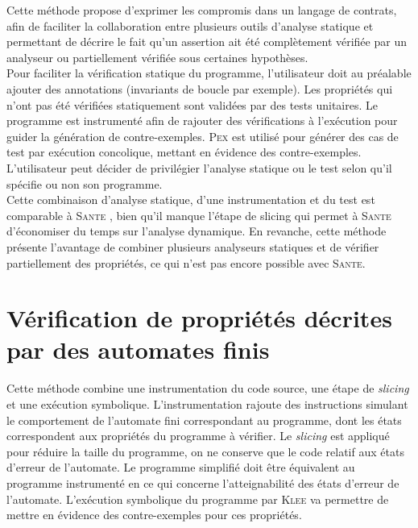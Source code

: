Cette méthode propose d'exprimer les compromis dans un langage de contrats,
afin de faciliter la collaboration entre plusieurs outils d'analyse statique
et permettant de décrire le fait qu'un assertion ait été complètement vérifiée
par un analyseur ou partiellement vérifiée sous certaines hypothèses.\\

Pour faciliter la vérification statique du programme, l'utilisateur doit au
préalable ajouter des annotations (invariants de boucle par exemple). Les
propriétés qui n'ont pas été vérifiées statiquement sont validées par des tests
unitaires. Le programme est instrumenté afin de rajouter des vérifications à
l'exécution pour guider la génération de contre-exemples. \textsc{Pex}
\cite{PEX} est utilisé pour générer des cas de test par exécution concolique,
mettant en évidence des contre-exemples. L'utilisateur peut décider de
privilégier l'analyse statique ou le test selon qu'il spécifie ou non son
programme.\\

Cette combinaison d'analyse statique, d'une instrumentation et du test est
comparable à \textsc{Sante} \cite{SANTE}, bien qu'il manque l'étape de slicing
qui permet à \textsc{Sante} d'économiser du temps sur l'analyse dynamique. En
revanche, cette méthode présente l'avantage de combiner plusieurs analyseurs
statiques et de vérifier partiellement des propriétés, ce qui n'est pas encore
possible avec \textsc{Sante}.

\section{Vérification de propriétés décrites par des automates finis}

Cette méthode \cite{checking-prop-state-machines} combine une instrumentation du
code source, une étape de {\em slicing} et une exécution symbolique.
L'instrumentation rajoute des instructions simulant le comportement de
l'automate fini correspondant au programme, dont les états correspondent aux
propriétés du programme à vérifier.
Le {\em slicing} est appliqué pour réduire la taille du programme, on ne
conserve que le code relatif aux états d'erreur de l'automate. Le programme
simplifié doit être équivalent au programme instrumenté en ce qui concerne
l'atteignabilité des états d'erreur de l'automate.
L'exécution symbolique du programme par \textsc{Klee} \cite{KLEE} va permettre
de mettre en évidence des contre-exemples pour ces propriétés.\\

